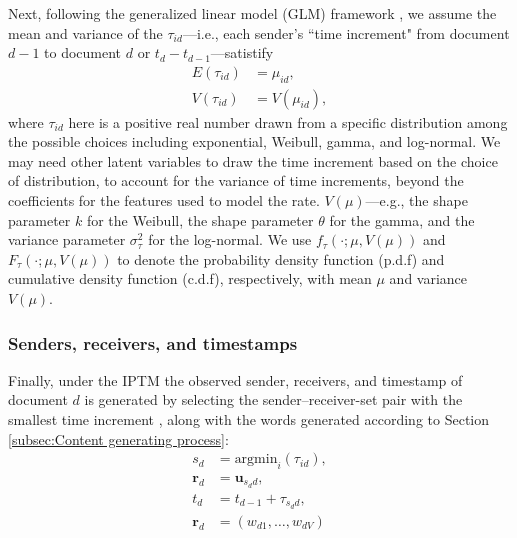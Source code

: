\documentclass[ba]{imsart}
\numberwithin{equation}{section}
\theoremstyle{plain}
\begin{document}
	Next, following the generalized linear model (GLM) framework \citep{nelder1972generalized}, we assume the mean and variance of the $\tau_{id}$---i.e., each sender's ``time increment" from document $d-1$ to document $d$ or $t_d-t_{d-1}$---satistify
	\begin{equation}
		\begin{aligned}
			E(\tau_{id}) &= \mu_{id},\\
			V(\tau_{id}) &= V(\mu_{id}),
		\end{aligned}
	\end{equation}
	where $\tau_{id}$ here is a positive real number drawn from a specific distribution among the possible choices including exponential, Weibull, gamma, and log-normal. We may need other latent variables to draw the time increment based on the choice of distribution, to account for the variance of time increments, beyond the coefficients for the features used to model the rate. $V(\mu)$---e.g., the shape parameter $k$ for the Weibull, the shape parameter $\theta$ for the gamma, and the variance parameter $\sigma_\tau^2$ for the log-normal. We use $f_\tau(\cdot; \mu, V(\mu))$ and $F_\tau(\cdot; \mu, V(\mu))$ to denote the probability density function (p.d.f) and cumulative density function (c.d.f), respectively, with mean $\mu$ and variance $V(\mu)$.~
	\subsubsection{Senders, receivers, and timestamps}\label{subsubsec:Observed}
	Finally, under the IPTM the observed sender, receivers, and timestamp of document $d$ is generated by selecting the sender--receiver-set pair with the smallest time increment \citep{snijders1996stochastic}, along with the words generated according to Section \ref{subsec:Content generating process}:
	\begin{equation}
		\begin{aligned}
			s_d &= \mbox{argmin}_{i}(\tau_{id}),\\
			\boldsymbol{r}_d &= \boldsymbol{u}_{s_d d},\\
			t_d &=t_{d-1} + \tau_{s_d d},\\
					\boldsymbol{r}_d &=(w_{d1},\ldots,w_{dV})
		\end{aligned}
	\end{equation}
~
\end{document}
